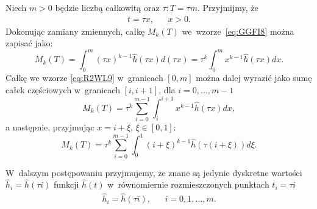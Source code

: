 \documentclass[paper=a4,DIV=12]{lpas}
\begin{document}
\begin{appendices}
  Niech $m > 0$ będzie liczbą całkowitą oraz $\tau:  T = \tau m$. Przyjmijmy, że
  \begin{equation}
    \begin{aligned}
      & t = \tau x, && x > 0.&
    \end{aligned}
    \label{eq:J7GYY}
  \end{equation}
  Dokonując zamiany zmiennych, całkę $M_k(T)$ we~wzorze~\eqref{eq:GGFI8} można
  zapisać jako:
  \begin{equation}
    M_k(T) = \int_0^m{(\tau x)^{k-1} \hat{h}(\tau x) d(\tau x)}
           = \tau^k \int_0^m{x^{k-1} \hat{h}(\tau x) dx}.
    \label{eq:R2WL9}
  \end{equation}
  Całkę we wzorze \eqref{eq:R2WL9} w~granicach $[0,m]$ można dalej wyrazić jako
  sumę całek częściowych w~granicach $[i,i+1]$, dla $i=0,\dots,m-1$
  \begin{equation}
    M_k(T) = \tau^k \sum_{i=0}^{m-1} \int_i^{i+1} x^{k-1}\hat{h}(\tau x) dx,
    \label{eq:NP3NQ}
  \end{equation}
  a następnie, przyjmując $x = i + \xi$, $\xi \in [0,1]$:
  \begin{equation}
    M_k(T) = \tau^k \sum_{i=0}^{m-1} \int_0^1 (i + \xi)^{k-1}\hat{h}(\tau (i + \xi)) d\xi.
    \label{eq:O5GB0}
  \end{equation}

  W~dalszym postępowaniu przyjmujemy, że znane są jedynie dyskretne wartości
  $\hat{h}_i = \hat{h}(\tau i)$ funkcji $\hat{h}(t)$ w~równomiernie
  rozmieszczonych punktach $t_i = \tau i$
  \begin{equation}
    \begin{aligned}
      & \hat{h}_i = \hat{h}(\tau i), && i = 0, 1, \dots, m.&
    \end{aligned}
    \label{eq:0XLVC}
  \end{equation}


\end{appendices}
\end{document}
